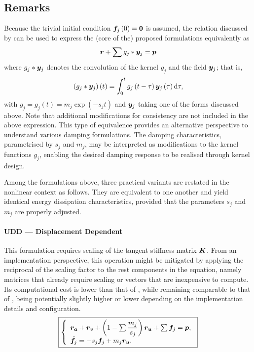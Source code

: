 \subsection{Remarks}
Because the trivial initial condition $\bm{f}_j\left(0\right)=\bm{0}$ is assumed, the relation discussed by \citet{Chang2024} can be used to express the (core of the) proposed formulations equivalently as
\begin{gather}
    \bm{r}+\sum{}g_j*\bm{y}_j=\bm{p}
\end{gather}
where $g_j*\bm{y}_j$ denotes the convolution of the kernel $g_j$ and the field $\bm{y}_j$; that is,
\begin{gather}\label{eq:conv}
    \left(g_j*\bm{y}_j\right)\left(t\right)=\int_0^tg_j\left(t-\tau\right)\bm{y}_j\left(\tau\right)\mathrm{d}\tau,
\end{gather}
with $g_j=g_j\left(t\right)=m_j\exp\left(-s_jt\right)$ and $\bm{y}_j$ taking one of the forms discussed above.
Note that additional modifications for consistency are not included in the above expression.
This type of equivalence provides an alternative perspective to understand various damping formulations.
The damping characteristics, parametrised by $s_j$ and $m_j$, may be interpreted as modifications to the kernel functions $g_j$, enabling the desired damping response to be realised through kernel design.

Among the formulations above, three practical variants are restated in the nonlinear context as follows.
They are equivalent to one another and yield identical energy dissipation characteristics, provided that the parameters $s_j$ and $m_j$ are properly adjusted.
\paragraph{UDD --- Displacement Dependent}
This formulation requires scaling of the tangent stiffness matrix $\bm{K}$.
From an implementation perspective, this operation might be mitigated by applying the reciprocal of the scaling factor to the rest components in the equation, namely matrices that already require scaling or vectors that are inexpensive to compute.
Its computational cost is lower than that of , while remaining comparable to that of , being potentially slightly higher or lower depending on the implementation details and configuration.
\begin{gather}\label{eq:u_final}
\boxed{
    \left\{\begin{array}{l}
        \bm{r}_{\bm{a}}+\bm{r}_{\bm{v}}+\left(1-\sum\dfrac{m_j}{s_j}\right)\bm{r}_{\bm{u}}+\sum\bm{f}_j=\bm{p}, \\
        \dot{\bm{f}}_j=-s_j\bm{f}_j+m_j\bm{r}_{\bm{u}}.
    \end{array}\right.
}
\end{gather}
